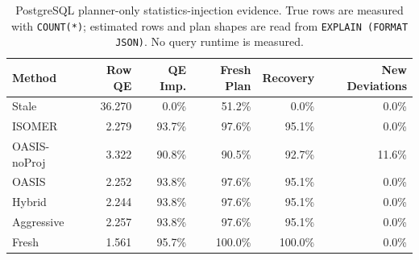 \begin{table}[t]
  \centering
  \small
  \caption{PostgreSQL planner-only statistics-injection evidence. True rows are measured with \texttt{COUNT(*)}; estimated rows and plan shapes are read from \texttt{EXPLAIN (FORMAT JSON)}. No query runtime is measured.}
  \label{tab:postgres_planner_stats_injection}
  \setlength{\tabcolsep}{4pt}
  \begin{tabular}{lrrrrr}
    \toprule
    Method & Row QE & QE Imp. & Fresh Plan & Recovery & New Deviations \\
    \midrule
    Stale & 36.270 & 0.0\% & 51.2\% & 0.0\% & 0.0\% \\
    ISOMER & 2.279 & 93.7\% & 97.6\% & 95.1\% & 0.0\% \\
    OASIS-noProj & 3.322 & 90.8\% & 90.5\% & 92.7\% & 11.6\% \\
    OASIS & 2.252 & 93.8\% & 97.6\% & 95.1\% & 0.0\% \\
    Hybrid & 2.244 & 93.8\% & 97.6\% & 95.1\% & 0.0\% \\
    Aggressive & 2.257 & 93.8\% & 97.6\% & 95.1\% & 0.0\% \\
    Fresh & 1.561 & 95.7\% & 100.0\% & 100.0\% & 0.0\% \\
    \bottomrule
  \end{tabular}
\end{table}
